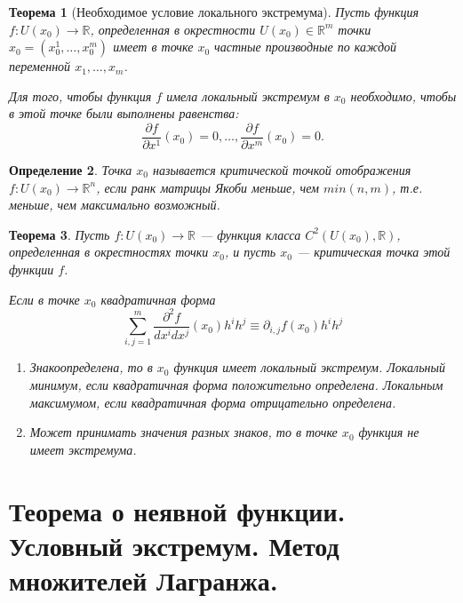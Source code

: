 \documentclass[12pt]{report}
\theoremstyle{plain}
\newtheorem{theorem}{Теорема}[chapter]
\newtheorem{definition}[theorem]{Определение}
\newcommand{\R}{\mathbb R}
\begin{document}
\begin{theorem}[Необходимое условие локального экстремума]
Пусть функция $f: U(x_0) \rightarrow \R$, определенная в окрестности
$U(x_0) \in \R^m$ точки $x_0 = (x_0^1, \dots, x_0^m)$ имеет в точке
$x_0$ частные производные по каждой переменной $x_1, \dots, x_m$.

Для того, чтобы функция $f$ имела локальный экстремум в $x_0$ необходимо,
чтобы в этой точке были выполнены равенства:
$$
\dfrac{\partial f}{\partial x^1}(x_0) = 0, \dots, \dfrac{\partial f}{\partial x^m}(x_0) = 0.
$$
\end{theorem}

\begin{definition}
Точка $x_0$ называется критической точкой отображения $f: U(x_0) \rightarrow \R^n$,
если ранк матрицы Якоби меньше, чем $min(n, m)$, т.е. меньше, чем максимально возможный.
\end{definition}

\begin{theorem}
Пусть $f: U(x_0) \rightarrow \R$ --- функция класса $C^2(U(x_0), \R)$,
определенная в окрестностях точки $x_0$, и пусть $x_0$ --- критическая точка
этой функции $f$.

Если в точке $x_0$ квадратичная форма
$$
\sum\limits_{i, j=1}^m \dfrac{\partial^2 f}{dx^i dx^j} (x_0) h^i h^j
\equiv
\partial_{i, j} f(x_0) h^i h^j
$$

\begin{enumerate}
\item Знакоопределена, то в $x_0$ функция имеет локальный экстремум.
Локальный минимум, если квадратичная форма положительно определена.
Локальным максимумом, если квадратичная форма отрицательно определена.
\item Может принимать значения разных знаков, то в точке $x_0$ функция не имеет
экстремума.
\end{enumerate}

\end{theorem}


\section{Теорема о неявной функции. Условный экстремум. Метод множителей Лагранжа.}
\end{document}
